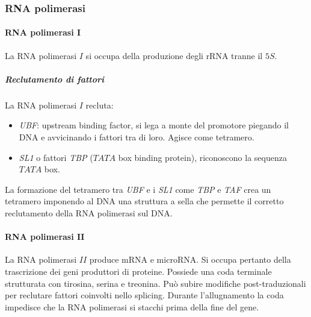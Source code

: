 		\subsubsection{RNA polimerasi}

			\paragraph{RNA polimerasi $\mathbf{I}$}
			La RNA polimerasi $I$ si occupa della produzione degli rRNA tranne il $5S$.

				\subparagraph{Reclutamento di fattori}
				La RNA polimerasi $I$ recluta:
				\begin{multicols}{2}
					\begin{itemize}
						\item \emph{UBF}: upstream binding factor, si lega a monte del promotore piegando il DNA e avvicinando i fattori tra di loro.
							Agisce come tetramero.
						\item \emph{SL1} o fattori \emph{TBP} ($TATA$ box binding protein), riconoscono la sequenza $TATA$ box.
					\end{itemize}
				\end{multicols}
				La formazione del tetramero tra \emph{UBF} e i \emph{SL1} come \emph{TBP} e \emph{TAF} crea un tetramero imponendo al DNA una struttura a sella che permette il corretto reclutamento della RNA polimerasi sul DNA.

			\paragraph{RNA polimerasi $\mathbf{II}$}
			La RNA polimerasi $II$ produce mRNA e microRNA.
			Si occupa pertanto della trascrizione dei geni produttori di proteine.
			Possiede una coda terminale strutturata con tirosina, serina e treonina.
			Pu\`o subire modifiche post-traduzionali per reclutare fattori coinvolti nello splicing.
			Durante l'allugnamento la coda impedisce che la RNA polimerasi si stacchi prima della fine del gene.

